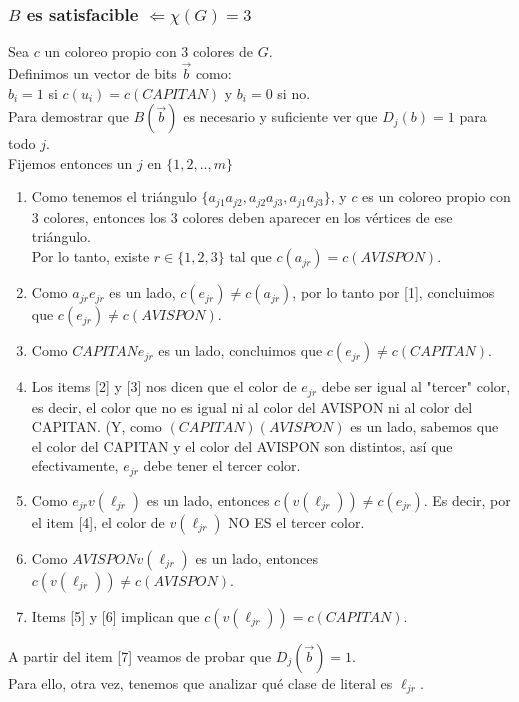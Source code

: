\documentclass[11pt, a4paper]{article}
\theoremstyle{definition}
\begin{document}
\subsubsection*{$B$ es satisfacible $\Leftarrow \chi(G) = 3$}
Sea $c$ un coloreo propio con 3 colores de $G$.\\
Definimos un vector de bits $\vec{b}$ como:\\
$b_i = 1$ si $c(u_i) = c(CAPITAN)$ y $b_i = 0$ si no.\\
Para demostrar que $B(\vec{b})$ es necesario y suficiente ver que $D_j(b) = 1$ para todo $j$.\\
Fijemos entonces un $j$ en $\{1, 2, .., m\}$
\begin{enumerate}
    \item  Como tenemos el triángulo $\{a_{j1}a_{j2}, a_{j2}a_{j3}, a_{j1}a_{j3}\}$, y $c$ es un coloreo propio con 3 colores, entonces los 3 colores deben
    aparecer en los vértices de ese triángulo.\\
    Por lo tanto, existe $r \in \{1, 2, 3\}$ tal que $c(a_{jr}) = c(AVISPON)$.
    \item Como $a_{jr}e_{jr}$ es un lado, $c(e_{jr}) \neq c(a_{jr})$, por lo tanto por [1], concluimos que $c(e_{jr}) \neq c(AVISPON)$.
    \item Como $CAPITAN e_{jr}$ es un lado, concluimos que $c(e_{jr}) \neq c(CAPITAN)$.
    \item Los items [2] y [3] nos dicen que el color de $e_{jr}$ debe ser igual al "tercer" color, es decir, el color que no es igual ni al
    color del AVISPON ni al color del CAPITAN. (Y, como $(CAPITAN)(AVISPON)$ es un lado, sabemos que el color del
    CAPITAN y el color del AVISPON son distintos, así que efectivamente, $e_{jr}$ debe tener el tercer color.
    \item Como $e_{jr}v(\ell_{jr})$ es un lado, entonces $c(v(\ell_{jr})) \neq c(e_{jr})$. Es decir, por el item [4], el color de $v(\ell_{jr})$ NO ES el tercer color.
    \item Como $AVISPON v(\ell_{jr})$ es un lado, entonces $c(v(\ell_{jr})) \neq c(AVISPON)$.
    \item Items [5] y [6] implican que $c(v(\ell_{jr})) = c(CAPITAN)$.
\end{enumerate}
A partir del item [7] veamos de probar que $D_j(\vec{b}) = 1$. \\
Para ello, otra vez, tenemos que analizar qué clase de literal es $\ell_{jr}$.
\end{document}
